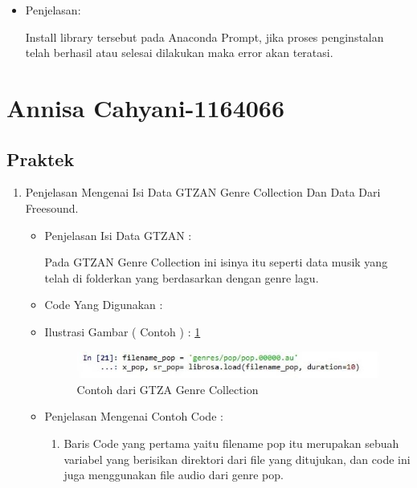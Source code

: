 \begin{enumerate}
\begin{itemize}
\item Penjelasan:

 Install library tersebut pada Anaconda Prompt, jika proses penginstalan telah berhasil atau selesai dilakukan maka error akan teratasi.

\end{itemize}

\end{enumerate}


\section{Annisa Cahyani-1164066}
\subsection{Praktek}
\begin{enumerate}
\item Penjelasan Mengenai Isi Data GTZAN Genre Collection Dan Data Dari Freesound.
\begin{itemize}
\item Penjelasan Isi Data GTZAN :
\par Pada GTZAN Genre Collection ini isinya itu seperti data musik yang telah di folderkan yang berdasarkan dengan genre lagu.
\par
\item Code Yang Digunakan :
\par

\par
\par
\item Ilustrasi Gambar ( Contoh ) : \ref{cahya-chapter6-1}
\par
\begin{figure}[!hbtp]
\centering
\includegraphics[scale=0.2]{figures/cahya-chapter6-1.jpg}
\caption{Contoh dari GTZA Genre Collection}
\label{cahya-chapter6-1}
\end{figure}
\par
\item Penjelasan Mengenai Contoh Code :
\begin{enumerate}
\item Baris Code yang pertama yaitu filename pop itu merupakan sebuah variabel yang berisikan direktori dari file yang ditujukan, dan code ini juga menggunakan file audio dari genre pop.

\end{enumerate}
\end{itemize}
\end{enumerate}
